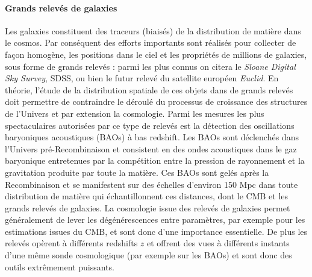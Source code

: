 \paragraph{Grands relevés de galaxies}
Les galaxies  constituent des traceurs (biaisés) de la distribution de matière dans le cosmos. Par conséquent des efforts importants sont réalisés pour collecter de façon homogène, les positions dans le ciel et les propriétés de millions de galaxies, sous forme de grands relevés : parmi les plus connus on citera le \textit{Sloane Digital Sky Survey}, SDSS, ou bien le futur relevé du satellite européen \textit{Euclid}. En théorie, l'étude de la distribution spatiale de ces objets dans de grands relevés doit permettre de contraindre le déroulé du processus de croissance des structures de l'Univers et par extension la cosmologie. Parmi les mesures les plus spectaculaires autorisées par ce type de relevés est la détection des oscillations baryoniques acoustiques (BAOs) à bas redshift. Les BAOs sont déclenchés dans l'Univers pré-Recombinaison et consistent en des ondes acoustiques dans le gaz baryonique entretenues par la compétition entre la pression de rayonnement et la gravitation produite par toute la matière. Ces BAOs sont gelés après la Recombinaison et se manifestent sur des échelles d'environ 150 Mpc dans toute distribution de matière qui échantillonnent ces distances, dont le CMB et les grands relevés de galaxies.  La cosmologie issue des relevés de galaxies permet généralement de lever les dégénérescences entre paramètres, par exemple pour les estimations issues du CMB, et sont donc d'une importance essentielle. De plus les relevés opèrent à différents redshifts $z$ et offrent  des vues à différents instants d'une même sonde cosmologique (par exemple sur les BAOs) et sont donc des outils extrêmement puissants.

